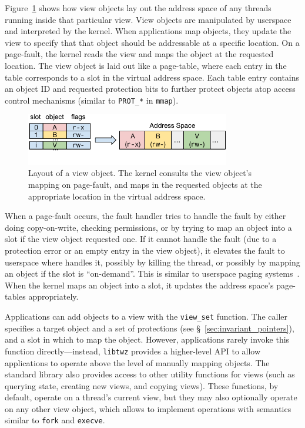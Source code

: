 {    Figure~\ref{fig:view} shows how view objects lay out the address space of any threads running inside
    that particular view. View objects are manipulated by userspace and interpreted by the kernel. When
    applications map objects, they update the view to specify that that object should be addressable at
    a specific location. On a page-fault, the kernel reads the view and maps the object at the requested
    location. The view object is laid out like a page-table, where each entry in the table corresponds
    to a slot in the virtual address space. Each table entry contains an object ID and requested
    protection bits to further protect objects atop access control mechanisms (similar to
    \texttt{PROT\_*} in \texttt{mmap}).

    \begin{figure}
        \centering
        \includegraphics[width=3.5in]{fig/view}
        \caption{Layout of a view object. The kernel consults the view object's mapping on page-fault,
            and maps in the requested objects at the appropriate location in the virtual address space.}
        \label{fig:view}
    \end{figure}

    When a page-fault occurs, the fault handler tries to handle the fault by either doing copy-on-write,
    checking permissions, or by trying to map an object into a slot if the view object requested one.
    If it cannot handle the fault (due to a protection error or an empty entry in the view
    object), it elevates the fault to userspace where \libcore handles it, possibly by killing the
    thread, or possibly by mapping an object if the slot is ``on-demand''. This is similar to userspace
    paging systems~\cite{l4,accetta:usenix86s}. When the kernel
    maps an object into a slot, it updates the address space's page-tables appropriately.

    Applications can add objects to a view with the \texttt{view\_set} function. The caller specifies a
    target object and a set of protections (see \S~\ref{sec:invariant_pointers}), and a slot in which to
    map the object. However, applications rarely invoke this function directly---instead,
    \texttt{libtwz} provides a higher-level API to allow applications to operate above the level of
    manually mapping objects. The standard library also provides access to other utility functions for
    views (such as querying state, creating new views, and copying views). These functions, by default,
    operate on a thread's current view, but they may also optionally operate on any other view object,
    which allows \Twizzler to implement operations with semantics similar to \texttt{fork} and \texttt{execve}.

}
